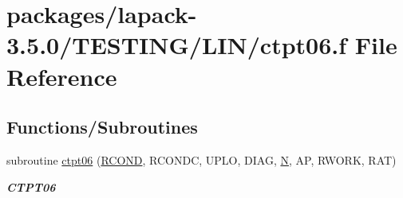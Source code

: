 \hypertarget{ctpt06_8f}{}\section{packages/lapack-\/3.5.0/\+T\+E\+S\+T\+I\+N\+G/\+L\+I\+N/ctpt06.f File Reference}
\label{ctpt06_8f}
\subsection*{Functions/\+Subroutines}
\begin{DoxyCompactItemize}
\item 
subroutine \hyperlink{group__complex__lin_ga6096fde995751b11c512561ecffccdb6}{ctpt06} (\hyperlink{superlu__enum__consts_8h_af00a42ecad444bbda75cde1b64bd7e72a9b5c151728d8512307565994c89919d5}{R\+C\+O\+N\+D}, R\+C\+O\+N\+D\+C, U\+P\+L\+O, D\+I\+A\+G, \hyperlink{polmisc_8c_a0240ac851181b84ac374872dc5434ee4}{N}, A\+P, R\+W\+O\+R\+K, R\+A\+T)
\begin{DoxyCompactList}\small\item\em {\bfseries C\+T\+P\+T06} \end{DoxyCompactList}\end{DoxyCompactItemize}

